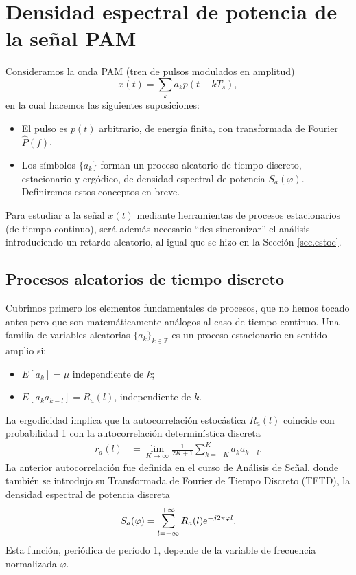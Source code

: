

\section{Densidad espectral de potencia de la señal PAM}\label{appendix:pam}

Consideramos la onda PAM (tren de pulsos modulados en amplitud)
\[
x(t) = \displaystyle\sum_k a_k p(t-kT_s),
\]
en la cual hacemos las siguientes suposiciones:
\begin{itemize}
    \item El pulso es $p(t)$ arbitrario, de energía finita, con transformada de Fourier $\hat{P}(f)$.
    \item Los símbolos $\{a_k\}$ forman un proceso aleatorio de tiempo discreto, estacionario y ergódico, de densidad
    espectral de potencia $S_a(\varphi)$. Definiremos estos conceptos en breve.
   \end{itemize}

Para estudiar a la se\~nal $x(t)$ mediante herramientas de procesos estacionarios (de tiempo continuo), será además
necesario ``des-sincronizar'' el análisis introduciendo un retardo aleatorio, al igual que se hizo en la Sección \ref{sec.estoc}.


\subsection*{Procesos aleatorios de tiempo discreto}

Cubrimos primero los elementos fundamentales de procesos, que no hemos tocado antes pero que son matemáticamente
análogos al caso de tiempo continuo. Una familia de variables aleatorias $\{a_k\}_{k\in \mathbb{Z}}$ es un proceso estacionario en sentido amplio si:
\begin{itemize}
\item $E[a_k]=\mu$ independiente de $k$;
\item $E[a_k a_{k-l}] = R_a(l)$, independiente de $k$.
\end{itemize}
La ergodicidad implica que la autocorrelación estocástica $R_a(l)$  coincide con probabilidad 1
con la autocorrelación determinística discreta
\begin{align*}
r_{a}(l) & = \lim_{K\to\infty} \frac{1}{2K+1} \sum_{k=-K}^{K}a_k a_{k-l}.
\end{align*}
La anterior autocorrelación fue definida en el curso de Análisis de Señal,
donde también se introdujo su Transformada de Fourier de Tiempo
Discreto (TFTD), la densidad espectral de potencia discreta
\begin{align}\label{eq.safi}
S_a(\varphi) = \sum_{l=-\infty}^{+\infty} R_a(l) \mathrm{e}^{-j 2\pi\varphi l}.
\end{align}
Esta función, periódica de período 1, depende de la variable de frecuencia normalizada $\varphi$.



